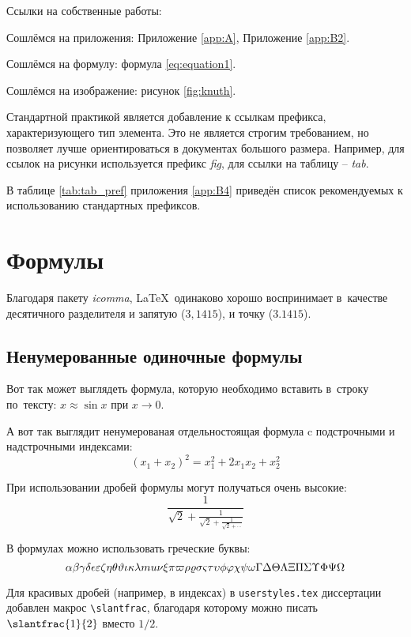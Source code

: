 Ссылки на собственные работы:~\cite{vakbib1, confbib1}

Сошлёмся на приложения: Приложение \ref{app:A}, Приложение \ref{app:B2}.

Сошлёмся на формулу: формула \eqref{eq:equation1}.

Сошлёмся на изображение: рисунок \ref{fig:knuth}.

Стандартной практикой является добавление к ссылкам префикса, характеризующего тип элемента.
Это не является строгим требованием, но позволяет лучше ориентироваться в документах большого размера.
Например, для ссылок на рисунки используется префикс \textit{fig},
для ссылки на таблицу -- \textit{tab}.

В таблице \ref{tab:tab_pref} приложения \ref{app:B4} приведён список рекомендуемых
к использованию стандартных префиксов.

\section{Формулы} \label{sec:ch1/sec0}

Благодаря пакету \textit{icomma}, \LaTeX~одинаково хорошо воспринимает
в~качестве десятичного разделителя и запятую ($3,1415$), и точку ($3.1415$).

\subsection{Ненумерованные одиночные формулы} \label{subsec:ch1/sec3/sub1}

Вот так может выглядеть формула, которую необходимо вставить в~строку
по~тексту: $x \approx \sin x$ при $x \to 0$.

А вот так выглядит ненумерованая отдельностоящая формула c подстрочными
и надстрочными индексами:
\[
(x_1+x_2)^2 = x_1^2 + 2 x_1 x_2 + x_2^2
\]

При использовании дробей формулы могут получаться очень высокие:
\[
  \frac{1}{\sqrt{2}+
  \displaystyle\frac{1}{\sqrt{2}+
  \displaystyle\frac{1}{\sqrt{2}+\cdots}}}
\]

В формулах можно использовать греческие буквы:
\[
\alpha\beta\gamma\delta\epsilon\varepsilon\zeta\eta\theta\vartheta\iota\kappa%
\lambda\\mu\nu\xi\pi\varpi\rho\varrho\sigma\varsigma\tau\upsilon\phi\varphi%
\chi\psi\omega\Gamma\Delta\Theta\Lambda\Xi\Pi\Sigma\Upsilon\Phi\Psi\Omega
\]

Для красивых дробей (например, в индексах) в
\verb+userstyles.tex+ диссертации добавлен макрос
\verb+\slantfrac+, благодаря которому можно
писать $\slantfrac{1}{2}$ вместо $1/2$.

